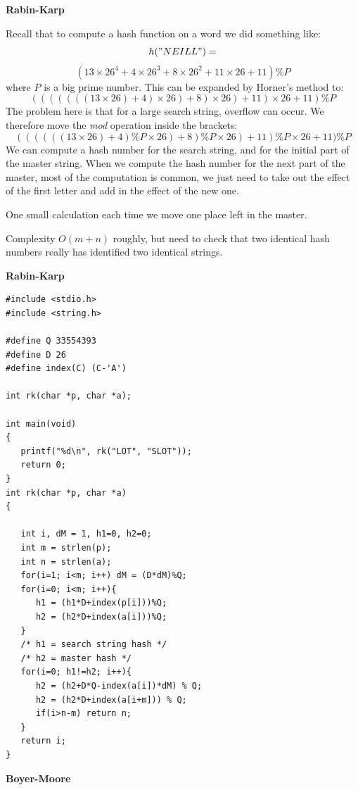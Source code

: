 \documentclass[a4,portraitt]{slides}
\begin{document}
{\newpage
{\samepage
\begin{center}
{\Large{\bf Rabin-Karp}}
\end{center}
{\small
Recall that to compute a hash function on a word we did something like:
\[
h("NEILL") =
\]
{\small
\[
(13\times26^4 + 4\times26^3 + 8\times26^2 + 11\times26 + 11) \% P
\]
}
where $P$ is a big prime number.
This can be expanded by Horner's method to:
{\small
\[
(((((((13\times26)+ 4)\times26) + 8)\times26) + 11)\times26 + 11) \% P
\]
}
The problem here is that for a large search string, overflow can occur.
We therefore move the {\it mod} operation inside the brackets:
{\small
\[
((((((13\times26)+ 4)\%P \times26) + 8)\%P \times26) + 11)\%P \times26 + 11) \% P
\]
}
We can compute a hash number for the search string, and for the initial
part of the master string.
When we compute the hash number for the next part of the master, most
of the computation is common, we just need to take out the effect of the first letter and add in the effect of the new one.

One small calculation each time we move one place left in the master.

Complexity $O(m+n)$ roughly, but need to check that two identical hash
numbers really has identified two identical strings.
}}

\newpage
{\samepage
\begin{center}
{\Large{\bf Rabin-Karp}}
\end{center}
{\small
\begin{verbatim}
#include <stdio.h>
#include <string.h>

#define Q 33554393
#define D 26
#define index(C) (C-'A')

int rk(char *p, char *a);

int main(void)
{
   printf("%d\n", rk("LOT", "SLOT"));
   return 0;
}
int rk(char *p, char *a)
{

   int i, dM = 1, h1=0, h2=0;
   int m = strlen(p);
   int n = strlen(a);
   for(i=1; i<m; i++) dM = (D*dM)%Q;
   for(i=0; i<m; i++){
      h1 = (h1*D+index(p[i]))%Q;
      h2 = (h2*D+index(a[i]))%Q;
   }
   /* h1 = search string hash */
   /* h2 = master hash */
   for(i=0; h1!=h2; i++){
      h2 = (h2+D*Q-index(a[i])*dM) % Q;
      h2 = (h2*D+index(a[i+m])) % Q;
      if(i>n-m) return n;
   }
   return i;
}
\end{verbatim}
}}

\newpage
{\samepage
\begin{center}
{\Large{\bf Boyer-Moore}}
\end{center}

}}
\end{document}

